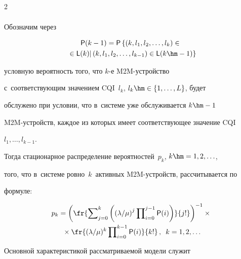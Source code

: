 \begin{multicols}{2}
\begin{multline}
  \label{e6-gud}


  \end{multline}


  


  Обозначим через 


  \begin{multline*}


  {\sf P}(k-1)={\sf P}\left\{ \left( k, l_1, l_2, \ldots , l_k\right)\in{}\right.\\


 \left. {}\in 


  {\sf L}(k)\vert \left(k,l_1,l_2,\ldots, l_{k-1}\right)\in {\sf  L}(k\hm-1)\right\}


\end{multline*} 


условную вероятность того, что $k$-е M2M-устрой\-ст\-во 


с~соответствующим значением CQI~$l_k$, $l_k\hm\in \{1,\ldots , L\}$, будет 


обслужено при условии, что в~системе уже обслуживается $k\hm-1$  


M2M-устройств, каждое из которых имеет соответствующее значение CQI 


$l_1,\ldots , l_{k-1}$. 


  


  Тогда стационарное распределение вероятностей~$p_k$, $k\hm=1,2,\ldots$, 


того, что в~системе ровно~$k$~активных M2M-устройств, рассчитывается по 


фор\-муле:


  \begin{multline*}


  p_k=\left( \fr{\sum\nolimits^k_{j=0}\left( \left( {\lambda}/{\mu}\right)^j 


\prod\nolimits_{i=0}^{j-1} {\sf P}(i)\right)}{j!}\right)^{-1}\times{}\\ 


{}\times \fr{(\lambda/\mu)^k \prod\nolimits_{i=0}^{k-1} {\sf P}(i)}{k!}\,,\enskip 


k=1,2,\ldots




  \end{multline*}


  


  Основной характеристикой рассматриваемой модели служит 



\end{multicols}
